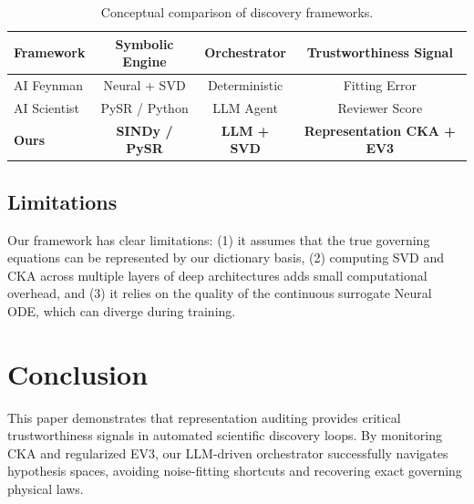 \documentclass{article}
\begin{document}
\begin{table}[htbp]
\centering
\caption{Conceptual comparison of discovery frameworks.}
\label{tab:baselines}
\begin{tabular}{lccc}
\toprule
Framework & Symbolic Engine & Orchestrator & Trustworthiness Signal \\
\midrule
AI Feynman & Neural + SVD & Deterministic & Fitting Error \\
AI Scientist & PySR / Python & LLM Agent & Reviewer Score \\
\textbf{Ours} & \textbf{SINDy / PySR} & \textbf{LLM + SVD} & \textbf{Representation CKA + EV3} \\
\bottomrule
\end{tabular}
\end{table}

\subsection{Limitations}
Our framework has clear limitations: (1) it assumes that the true governing equations can be represented by our dictionary basis, (2) computing SVD and CKA across multiple layers of deep architectures adds small computational overhead, and (3) it relies on the quality of the continuous surrogate Neural ODE, which can diverge during training.

\section{Conclusion}
This paper demonstrates that representation auditing provides critical trustworthiness signals in automated scientific discovery loops. By monitoring CKA and regularized EV3, our LLM-driven orchestrator successfully navigates hypothesis spaces, avoiding noise-fitting shortcuts and recovering exact governing physical laws.



\end{document}
